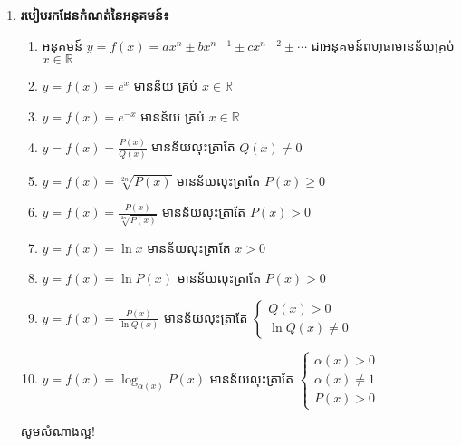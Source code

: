 \documentclass[12pt, a5paper]{article}
\begin{document}
\begin{enumerate}[m]
	\item \textbf{\sffamily របៀបរកដែនកំណត់នៃអនុគមន៍៖}
	\begin{enumerate}[k]
		\item អនុគមន៍ $y=f(x)=ax^n\pm bx^{n-1}\pm cx^{n-2}\pm\cdots$ ជាអនុគមន៍ពហុធាមានន័យគ្រប់ $x\in\mathbb{R}$
		\item $y=f(x)=e^x$ មានន័យ គ្រប់ $x\in\mathbb{R}$
		\item $y=f(x)=e^{-x}$ មានន័យ គ្រប់ $x\in\mathbb{R}$
		\item $y=f(x)=\frac{P(x)}{Q(x)}$ មានន័យលុះត្រាតែ $Q(x)\neq0$
		\item $y=f(x)=\sqrt[2n]{P(x)}$ មានន័យលុះត្រាតែ $P(x)\geq0$
		\item $y=f(x)=\frac{P(x)}{\sqrt[2n]{P(x)}}$ មានន័យលុះត្រាតែ $P(x)>0$
		\item $y=f(x)=\ln x$ មានន័យលុះត្រាតែ $x>0$
		\item $y=f(x)=\ln P(x)$ មានន័យលុះត្រាតែ $P(x)>0$
		\item $y=f(x)=\frac{P(x)}{\ln Q(x)}$ មានន័យលុះត្រាតែ 
		$\begin{cases}
			\text{$Q(x)>0$}\\
			\text{$\ln Q(x)\neq0$}	
		\end{cases}$
		\item $y=f(x)=\log_{\alpha(x)}P(x)$ មានន័យលុះត្រាតែ 
		$\begin{cases}
			\text{$\alpha(x)>0$}\\
			\text{$\alpha(x)\neq1$}\\
			\text{$P(x)>0$}
		\end{cases}$		
	\end{enumerate}
	\begin{center}
		\sffamily\color{black}
		សូមសំណាងល្អ!
	\end{center}
\end{enumerate}
\end{document}
